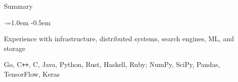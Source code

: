 \documentclass{resume} %
\begin{document}

\begin{rSection}{Summary}
  \vspace{0.5em}
  \begin{list}{$\cdot$}{\leftmargin=1.0em}
    \itemsep -0.5em \vspace{-0.5em}
    \item Experience with infrastructure, distributed systems, search engines,
      ML, and storage
    \item Go, C\texttt{++}, C, Java, Python, Rust, Haskell, Ruby; NumPy, SciPy,
      Pandas, TensorFlow, Keras
  \end{list}
  \vspace{0.5em}
\end{rSection}

\end{document}
